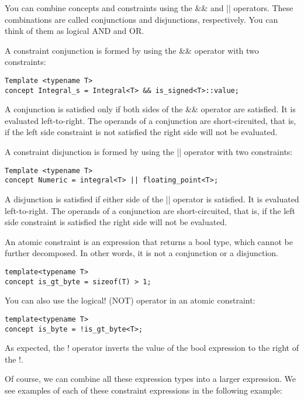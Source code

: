 You can combine concepts and constraints using the \&\& and || operators. These combinations are called conjunctions and disjunctions, respectively. You can think of them as logical AND and OR.

A constraint conjunction is formed by using the \&\& operator with two constraints:

\begin{lstlisting}[style=styleCXX]
Template <typename T>
concept Integral_s = Integral<T> && is_signed<T>::value;
\end{lstlisting}

A conjunction is satisfied only if both sides of the \&\& operator are satisfied. It is evaluated left-to-right. The operands of a conjunction are short-circuited, that is, if the left side constraint is not satisfied the right side will not be evaluated.

A constraint disjunction is formed by using the || operator with two constraints:

\begin{lstlisting}[style=styleCXX]
Template <typename T>
concept Numeric = integral<T> || floating_point<T>;
\end{lstlisting}

A disjunction is satisfied if either side of the || operator is satisfied. It is evaluated left-to-right. The operands of a conjunction are short-circuited, that is, if the left side constraint is satisfied the right side will not be evaluated.

An atomic constraint is an expression that returns a bool type, which cannot be further decomposed. In other words, it is not a conjunction or a disjunction.

\begin{lstlisting}[style=styleCXX]
template<typename T>
concept is_gt_byte = sizeof(T) > 1;
\end{lstlisting}

You can also use the logical! (NOT) operator in an atomic constraint:

\begin{lstlisting}[style=styleCXX]
template<typename T>
concept is_byte = !is_gt_byte<T>;
\end{lstlisting}

As expected, the ! operator inverts the value of the bool expression to the right of the !.

Of course, we can combine all these expression types into a larger expression. We see examples of each of these constraint expressions in the following example:

